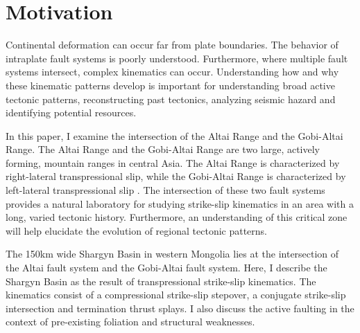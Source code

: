 \section{Motivation}
	Continental deformation can occur far from plate boundaries. The behavior of intraplate fault systems is poorly understood. Furthermore, where multiple fault systems intersect, complex kinematics can occur. Understanding how and why these kinematic patterns develop is important for understanding broad active tectonic patterns, reconstructing past tectonics, analyzing seismic hazard and identifying potential resources. 

	In this paper, I examine the intersection of the Altai Range and the Gobi-Altai Range. The Altai Range and the Gobi-Altai Range are two large, actively forming, mountain ranges in central Asia. The Altai Range is characterized by right-lateral transpressional slip, while the Gobi-Altai Range is characterized by left-lateral transpressional slip \citep{Cunningham2005a}\citep{Cunningham2010}. The intersection of these two fault systems provides a natural laboratory for studying strike-slip kinematics in an area with a long, varied tectonic history. Furthermore, an understanding of this critical zone will help elucidate the evolution of regional tectonic patterns.

	The 150km wide Shargyn Basin in western Mongolia lies at the intersection of the Altai fault system and the Gobi-Altai fault system. Here, I describe the Shargyn Basin as the result of transpressional strike-slip kinematics. The kinematics consist of a compressional strike-slip stepover, a conjugate strike-slip intersection and termination thrust splays. I also discuss the active faulting in the context of pre-existing foliation and structural weaknesses.

